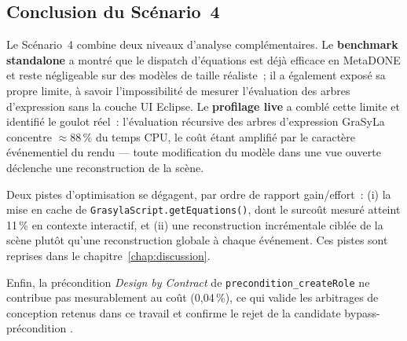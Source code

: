 \subsection{Conclusion du Scénario~4}

Le Scénario~4 combine deux niveaux d'analyse complémentaires. Le
\textbf{benchmark standalone} a montré que le dispatch d'équations est
déjà efficace en MetaDONE et reste négligeable sur des modèles de taille
réaliste~; il a également exposé sa propre limite, à savoir l'impossibilité
de mesurer l'évaluation des arbres d'expression sans la couche UI Eclipse.
Le \textbf{profilage live} a comblé cette limite et identifié le goulot
réel~: l'évaluation récursive des arbres d'expression GraSyLa concentre
$\approx 88\,\%$ du temps CPU, le coût étant amplifié par le caractère
événementiel du rendu --- toute modification du modèle dans une vue ouverte
déclenche une reconstruction de la scène.

Deux pistes d'optimisation se dégagent, par ordre de rapport gain/effort~:
(i) la mise en cache de \texttt{GrasylaScript.getEquations()}, dont le
surcoût mesuré atteint 11\,\% en contexte interactif, et (ii) une
reconstruction incrémentale ciblée de la scène plutôt qu'une reconstruction
globale à chaque événement. Ces pistes sont reprises dans le
chapitre~\ref{chap:discussion}.

Enfin, la précondition \emph{Design by Contract} de
\texttt{precondition\_createRole} ne contribue pas mesurablement au coût
(0,04\,\%), ce qui valide les arbitrages de conception retenus dans ce
travail et confirme le rejet de la candidate \og bypass-précondition \fg{}.
